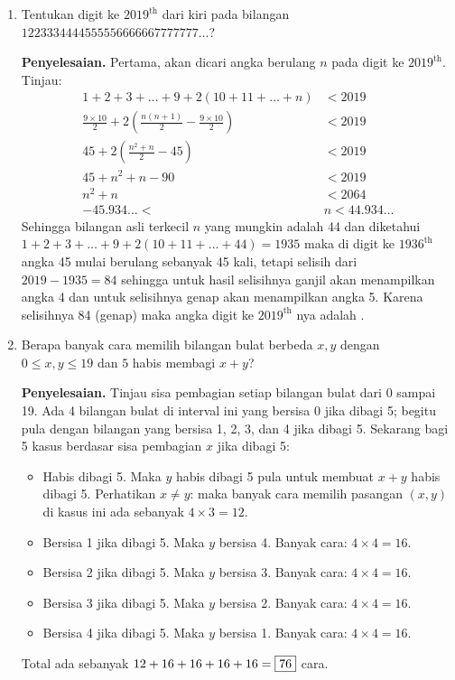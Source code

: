 \documentclass[12pt]{scrartcl}
\begin{document}
\begin{enumerate}
    \item Tentukan digit ke $2019^{\text{th}}$ dari kiri pada bilangan $1223334444555556666667777777\dots$?
    
    \textbf{Penyelesaian.} Pertama, akan dicari angka berulang $n$ pada digit ke $2019^{\text{th}}$. Tinjau:
    \begin{align*}
        1+2+3+\dots+9+2(10+11+\dots+n) &< 2019 \\
        \frac{9 \times 10}{2} + 2\left(\frac{n(n+1)}{2} - \frac{9 \times 10}{2}\right) &< 2019 \\
        45 + 2\left(\frac{n^2+n}{2} - 45\right) &< 2019 \\
        45 + n^2 + n - 90 &< 2019 \\
        n^2 + n &< 2064 \\
        -45.934\dots < &n < 44.934\dots
    \end{align*}
    Sehingga bilangan asli terkecil $n$ yang mungkin adalah 44 dan diketahui $1+2+3+\dots+9+2(10+11+\dots+44)=1935$ maka di digit ke $1936^{\text{th}}$ angka 45 mulai berulang sebanyak 45 kali, tetapi selisih dari $2019-1935=84$ sehingga untuk hasil selisihnya ganjil akan menampilkan angka 4 dan untuk selisihnya genap akan menampilkan angka 5. Karena selisihnya 84 (genap) maka angka digit ke $2019^{\text{th}}$ nya adalah .
    
    \item Berapa banyak cara memilih bilangan bulat berbeda $x, y$ dengan $0 \le x, y \le 19$ dan $5$ habis membagi $x+y$?
    
    \textbf{Penyelesaian.} Tinjau sisa pembagian setiap bilangan bulat dari 0 sampai 19. Ada 4 bilangan bulat di interval ini yang bersisa 0 jika dibagi 5; begitu pula dengan bilangan yang bersisa 1, 2, 3, dan 4 jika dibagi 5. Sekarang bagi 5 kasus berdasar sisa pembagian $x$ jika dibagi 5:
    \begin{itemize}
        \item Habis dibagi 5. Maka $y$ habis dibagi 5 pula untuk membuat $x+y$ habis dibagi 5. Perhatikan $x \ne y$: maka banyak cara memilih pasangan $(x, y)$ di kasus ini ada sebanyak $4 \times 3 = 12$.
        \item Bersisa 1 jika dibagi 5. Maka $y$ bersisa 4. Banyak cara: $4 \times 4 = 16$.
        \item Bersisa 2 jika dibagi 5. Maka $y$ bersisa 3. Banyak cara: $4 \times 4 = 16$.
        \item Bersisa 3 jika dibagi 5. Maka $y$ bersisa 2. Banyak cara: $4 \times 4 = 16$.
        \item Bersisa 4 jika dibagi 5. Maka $y$ bersisa 1. Banyak cara: $4 \times 4 = 16$.
    \end{itemize}
    Total ada sebanyak $12+16+16+16+16 = \fbox{76}$ cara.
    

\end{enumerate}
\end{document}

